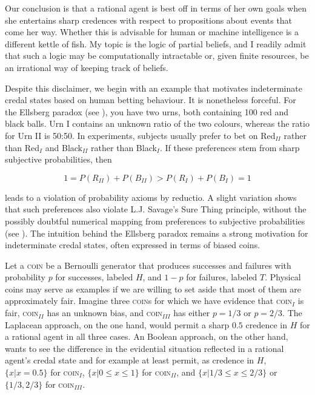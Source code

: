 \documentclass[11pt]{article}
\begin{document}
Our conclusion is that a rational agent is best off in terms of her
own goals when she entertains sharp credences with respect to
propositions about events that come her way. Whether this is advisable
for human or machine intelligence is a different kettle of fish. My
topic is the logic of partial beliefs, and I readily admit that such a
logic may be computationally intractable or, given finite resources,
be an irrational way of keeping track of beliefs.

Despite this disclaimer, we begin with an example that motivates
indeterminate credal states based on human betting behaviour. It is
nonetheless forceful. For the Ellsberg paradox (see
), you  have two urns, both containing 100
red and black balls. Urn I contains an unknown ratio of the two
colours, whereas the ratio for Urn II is 50:50. In experiments,
subjects usually prefer to bet on Red$_{II}$ rather than Red$_{I}$ and
Black$_{II}$ rather than Black$_{I}$. If these preferences stem from
sharp subjective probabilities, then 

\begin{equation}
  \label{eq:s1}
  1=P(R_{II})+P(B_{II})>P(R_{I})+P(B_{I})=1
\end{equation}

leads to a violation of probability axioms by reductio. A slight
variation shows that such preferences also violate L.J. Savage's Sure
Thing principle, without the possibly doubtful numerical mapping from
preferences to subjective probabilities (see
). The intuition behind the Ellsberg
paradox remains a strong motivation for indeterminate credal states, often
expressed in terms of biased coins.

Let a \textsc{coin} be a Bernoulli generator that produces successes
and failures with probability $p$ for successes, labeled $H$, and
$1-p$ for failures, labeled $T$. Physical coins may serve as examples
if we are willing to set aside that most of them are approximately
fair. Imagine three \textsc{coin}s for which we have evidence that
\textsc{coin}$_{I}$ is fair, \textsc{coin}$_{II}$ has an unknown bias,
and \textsc{coin}$_{III}$ has either $p=1/3$ or $p=2/3$. The Laplacean
approach, on the one hand, would permit a sharp $0.5$ credence in $H$
for a rational agent in all three cases. An Boolean approach, on the
other hand, wants to see the difference in the evidential situation
reflected in a rational agent's credal state and for example at least
permit, as credence in $H$, $\{x|x=0.5\}$ for \textsc{coin}$_{I}$,
$\{x|0\leq{}x\leq{}1\}$ for \textsc{coin}$_{II}$, and
$\{x|1/3\leq{}x\leq{}2/3\}$ or $\{1/3,2/3\}$ for
\textsc{coin}$_{III}$.
\end{document}

